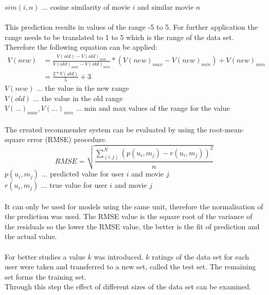 \documentclass[a4paper,12pt,twoside]{article}
\begin{document}
$sim(i,n)$ ... cosine similarity of movie $i$ and similar movie $n$\\
\\
This prediction results in values of the range -5 to 5. For further application the range needs to be translated to 1 to 5 which is the range of the data set. \\
Therefore the following equation can be applied:\\
\begin{equation}
\begin{split}
V(new) & = \frac{ V(old) - V(old)_{min}}{V(old)_{max} - V(old)_{min}} * (V(new)_{max} - V(new)_{min}) + V(new)_{min}\\
& = \frac{ 2* V(old)}{ 5} + 3
\end{split}
\end{equation}
$V(new)$ ... the value in the new range\\
$V(old)$ ... the value in the old range\\
$V(...)_{max}, V(...)_{min}$ ... min and max values of the range for the value\\
\\
The created recommender system can be evaluated by using the root-mean-square error (RMSE) procedure. 
\begin{equation}
RMSE =  \sqrt{\frac{\displaystyle\sum_{(i,j)}^{N}(p(u_i, m_j) - r(u_i,m_j))^2 }{n}}
\end{equation}
$ p(u_i, m_j) $ ... predicted value for user $i$ and movie $j$ \\
$ r(u_i,m_j) $ ... true value for user $i$ and movie $j$\\
\\
It can only be used for models using the same unit, therefore the normalisation of the prediction was used.
The RMSE value is the square root of the variance of the residuals so the lower the RMSE value, the better is the fit of prediction and the actual value. \cite{rsme}\\
\\
For better studies a value $k$ was introduced. $k$ ratings of the data set for each user were taken and transferred to a new set, called the test set. The remaining set forms the training set. \\ 
Through this step the effect of different sizes of the data set can be examined.
\end{document}
